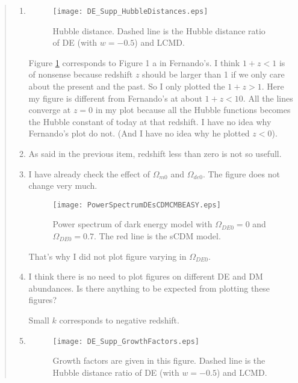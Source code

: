 \documentclass{article}
\begin{document}
\begin{quotation}
{\color{blue}


\begin{enumerate}

\item\label{item:HubbleDistance}

\begin{figure}[!htpb]
\centering
\texttt{[image: DE\_Supp\_HubbleDistances.eps]}
\caption{\color{blue}Hubble distance. Dashed line is the Hubble distance ratio of DE (with $w=-0.5$) and LCMD.}\label{fig:DE_Supp_HubbleDistances}
\end{figure}

Figure \ref{fig:DE_Supp_HubbleDistances} corresponds to Figure 1 {a} in Fernando's. I think $1+z<1$ is of nonsense because redshift $z$ should be larger than 1 if we only care about the present and the past. So I only plotted the $1+z>1$. Here my figure is different from Fernando's at about $1+z<10$. All the lines converge at $z=0$ in my plot because all the Hubble functions becomes the Hubble constant of today at that redshift. I have no idea why Fernando's plot do not. (And I have no idea why he plotted $z<0$).


\item
As said in the previous item, redshift less than zero is not so usefull.

\item
I have already check the effect of $\Omega_{m0}$ and $\Omega_{de0}$. The figure does not change very much.

\begin{figure}[!htpb]
\centering
\texttt{[image: PowerSpectrumDEsCDMCMBEASY.eps]}
\caption{\color{blue}Power spectrum of dark energy model with $\Omega_{DE0}=0$ and $\Omega_{DE0}=0.7$. The red line is the sCDM model.}
\end{figure}

That's why I did not plot figure varying in $\Omega_{DE0}$.

\item
I think there is no need to plot figures on different DE and DM abundances. Is there anything to be expected from plotting these figures?

Small $k$ corresponds to negative redshift.

\item


\begin{figure}[!htpb]
\centering
\texttt{[image: DE\_Supp\_GrowthFactors.eps]}
\caption{\color{blue}Growth factors are given in this figure. Dashed line is the Hubble distance ratio of DE (with $w=-0.5$) and LCMD.}\label{fig:DE_Supp_GrowthFactors}
\end{figure}


\end{enumerate}}
\end{quotation}
\end{document}
